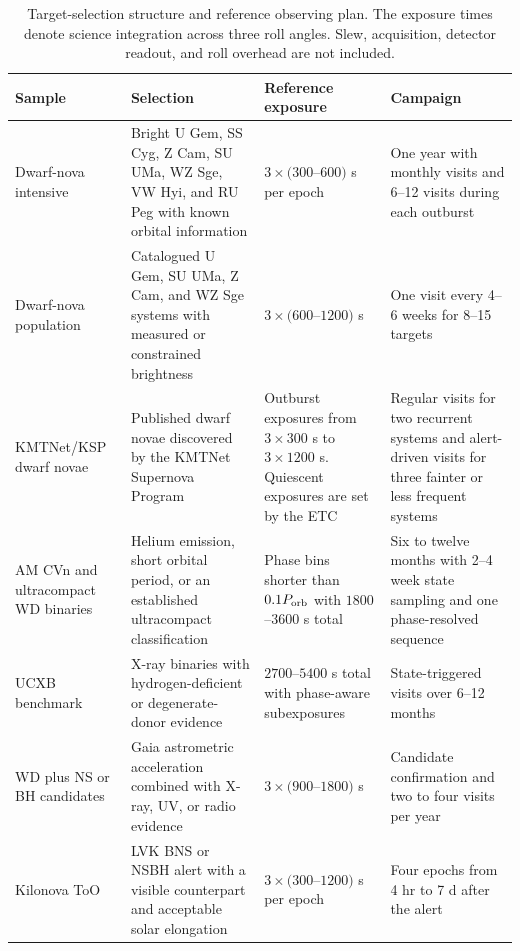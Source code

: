 \documentclass[10pt,onecolumn]{article}
\begin{document}
\begin{table}[H]
\centering
\caption{Target-selection structure and reference observing plan. The exposure
times denote science integration across three roll angles. Slew, acquisition,
detector readout, and roll overhead are not included.}
\label{tab:target_selection}
\begin{tabularx}{\textwidth}{@{}P{31mm} P{42mm} P{38mm} Y@{}}
\toprule
\textbf{Sample} & \textbf{Selection} & \textbf{Reference exposure} &
\textbf{Campaign}\\
\midrule
Dwarf-nova intensive & Bright U Gem, SS Cyg, Z Cam, SU UMa, WZ Sge,
VW Hyi, and RU Peg with known orbital information & $3\times(300$--$600)$ s
per epoch & One year with monthly visits and 6--12 visits during each outburst\\
Dwarf-nova population & Catalogued U Gem, SU UMa, Z Cam, and WZ Sge systems
with measured or constrained brightness & $3\times(600$--$1200)$ s &
One visit every 4--6 weeks for 8--15 targets\\
KMTNet/KSP dwarf novae & Published dwarf novae discovered by the KMTNet
Supernova Program & Outburst exposures from $3\times300$ s to
$3\times1200$ s. Quiescent exposures are set by the ETC &
Regular visits for two recurrent systems and alert-driven visits for three
fainter or less frequent systems\\
AM CVn and ultracompact WD binaries & Helium emission, short orbital period,
or an established ultracompact classification & Phase bins shorter than
$0.1P_{\rm orb}$ with $1800$--$3600$ s total & Six to twelve months with
2--4 week state sampling and one phase-resolved sequence\\
UCXB benchmark & X-ray binaries with hydrogen-deficient or degenerate-donor
evidence & $2700$--$5400$ s total with phase-aware subexposures &
State-triggered visits over 6--12 months\\
WD plus NS or BH candidates & Gaia astrometric acceleration combined with
X-ray, UV, or radio evidence & $3\times(900$--$1800)$ s & Candidate confirmation
and two to four visits per year\\
Kilonova ToO & LVK BNS or NSBH alert with a visible counterpart and acceptable
solar elongation & $3\times(300$--$1200)$ s per epoch & Four epochs from 4 hr to
7 d after the alert\\
\bottomrule
\end{tabularx}
\end{table}
\end{document}

